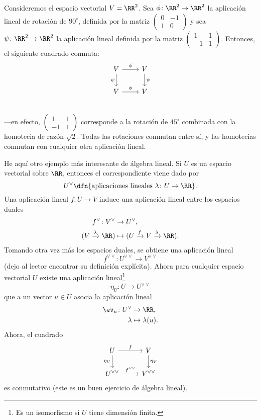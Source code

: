 \begin{ejemplo}
  Consideremos el espacio vectorial $V = \RR^2$. Sea
  $\phi\colon \RR^2 \to \RR^2$ la aplicación lineal de rotación de $90^\circ$,
  definida por la matriz $\begin{pmatrix}
    0 & -1 \\
    1 & 0
  \end{pmatrix}$ y sea $\psi\colon \RR^2 \to \RR^2$ la aplicación lineal
  definida por la matriz $\begin{pmatrix}
    1 & 1 \\
    -1 & 1
  \end{pmatrix}$. Entonces, el siguiente cuadrado conmuta:
  $$\begin{tikzcd}
    V \ar{r}{\phi}\ar{d}[swap]{\psi} & V \ar{d}{\psi} \\
    V \ar{r}{\phi} & V \\
  \end{tikzcd}$$
  ---en efecto, $\begin{pmatrix}
    1 & 1 \\
    -1 & 1
  \end{pmatrix}$ corresponde a la rotación de $45^\circ$ combinada con
  la homotecia de razón $\sqrt{2}$. Todas las rotaciones conmutan entre sí,
  y las homotecias conmutan con cualquier otra aplicación lineal.
\end{ejemplo}

\begin{ejemploast}
  He aquí otro ejemplo más interesante de álgebra lineal. Si $U$ es un espacio
  vectorial sobre $\RR$, entonces el  correspondiente viene
  dado por
  $$U^\vee \dfn \{ \text{aplicaciones lineales }\lambda\colon U\to \RR \}.$$
  Una aplicación lineal $f\colon U\to V$ induce una aplicación lineal entre los
  espacios duales
  \begin{align*}
    f^\vee\colon V^\vee & \to U^\vee,\\
    (V\xrightarrow{\lambda} \RR) & \mapsto (U \xrightarrow{f} V\xrightarrow{\lambda} \RR).
  \end{align*}
  Tomando otra vez más los espacios duales, se obtiene una aplicación lineal
  $$f^{\vee\vee}\colon U^{\vee\vee} \to V^{\vee\vee}$$
  (dejo al lector encontrar su definición explícita). Ahora para cualquier
  espacio vectorial $U$ existe una aplicación lineal\footnote{Es un isomorfismo
    si $U$ tiene dimensión finita.}
  $$\eta_U\colon U \to U^{\vee\vee}$$
  que a un vector $u\in U$ asocia la aplicación lineal
  \begin{align*}
    \ev_u\colon U^\vee & \to \RR,\\
    \lambda & \mapsto \lambda (u).
  \end{align*}
  Ahora, el cuadrado
  $$\begin{tikzcd}
    U \ar{r}{f}\ar{d}[swap]{\eta_U} & V \ar{d}{\eta_V} \\
    U^{\vee\vee} \ar{r}{f^{\vee\vee}} & V^{\vee\vee}
  \end{tikzcd}$$
  es conmutativo (este es un buen ejercicio de álgebra lineal).
\end{ejemploast}

